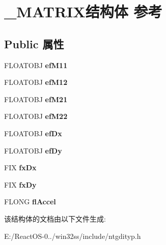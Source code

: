 \hypertarget{struct___m_a_t_r_i_x}{}\section{\+\_\+\+M\+A\+T\+R\+I\+X结构体 参考}
\label{struct___m_a_t_r_i_x}
\subsection*{Public 属性}
\begin{DoxyCompactItemize}
\item 
\mbox{\label{struct___m_a_t_r_i_x_a5eb1fd0069ec355c9427fc3070306fe7}} 
F\+L\+O\+A\+T\+O\+BJ {\bfseries ef\+M11}
\item 
\mbox{\label{struct___m_a_t_r_i_x_adcc0a06c01b71c1a21bd9341fad63f80}} 
F\+L\+O\+A\+T\+O\+BJ {\bfseries ef\+M12}
\item 
\mbox{\label{struct___m_a_t_r_i_x_a5671a1ffc72972e637dc2808240cd9ba}} 
F\+L\+O\+A\+T\+O\+BJ {\bfseries ef\+M21}
\item 
\mbox{\label{struct___m_a_t_r_i_x_ad07ac7d681838612f64a1d6511427fb5}} 
F\+L\+O\+A\+T\+O\+BJ {\bfseries ef\+M22}
\item 
\mbox{\label{struct___m_a_t_r_i_x_a721c2cde735a006bf8e61839f511e249}} 
F\+L\+O\+A\+T\+O\+BJ {\bfseries ef\+Dx}
\item 
\mbox{\label{struct___m_a_t_r_i_x_aba45c2c9dc118135add34adc88c25297}} 
F\+L\+O\+A\+T\+O\+BJ {\bfseries ef\+Dy}
\item 
\mbox{\label{struct___m_a_t_r_i_x_a8ab472f6bdd0d803b0e1c5b65c6e5b6d}} 
F\+IX {\bfseries fx\+Dx}
\item 
\mbox{\label{struct___m_a_t_r_i_x_a47a7a80f92fd8a3cc86db61c96f6efd9}} 
F\+IX {\bfseries fx\+Dy}
\item 
\mbox{\label{struct___m_a_t_r_i_x_ab50ac6d70c575dabf52b341be4ba6fdc}} 
F\+L\+O\+NG {\bfseries fl\+Accel}
\end{DoxyCompactItemize}


该结构体的文档由以下文件生成\+:\begin{DoxyCompactItemize}
\item 
E\+:/\+React\+O\+S-\/0../win32ss/include/ntgdityp.\+h\end{DoxyCompactItemize}

